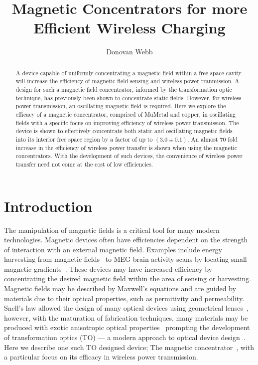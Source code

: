 \documentclass[11pt]{iopart}
\begin{document}
\title[]{Magnetic Concentrators for more Efficient Wireless Charging}

\author{Donovan Webb}

\address{Department of Physics,
University of Bath, Bath BA2 7AY, United Kingdom}

\begin{abstract}

A device capable of uniformly concentrating a magnetic field within a
free space cavity will increase the efficiency of magnetic field
sensing and wireless power tranmission.
A design for such a magnetic field concentrator, informed by the
transformation optic technique, has previously been shown to
concentrate static fields.
However, for wireless power transmission, an oscillating magnetic
field is required.
Here we explore the efficacy of a magnetic concentrator, comprised of
MuMetal and copper, in oscillating fields with a specific focus on
improving efficiency of wireless power transmission.
The device is shown to effectively concentrate both static and
oscillating magnetic fields into its interior free space region by a
factor of up to $(3.0\pm0.1)$. An almost $70$ fold increase in the
efficiency of wireless power transfer is shown when using the magnetic
concentrators.
With the development of such devices, the convenience of wireless
power transfer need not come at the cost of low efficiencies.


\end{abstract}
\section{Introduction}

The manipulation of magnetic fields is a critical tool for many modern
technologies. Magnetic devices often have efficiencies dependent on
the strength of interaction with an external magnetic field. Examples
include energy harvesting from magnetic fields~\cite{Hirai2000} to
MEG brain activity scans by locating small magnetic
gradients~\cite{Cohen1968}. These devices may have increased efficiency by
concentrating the desired magnetic field within the area of sensing or
harvesting. \\ Magnetic fields may be described by Maxwell's
equations and are guided by materials due to their
optical properties, such as permitivity and permeability. Snell's law
allowed the design of many optical devices
using geometrical lenses~\cite{Pendry2012}, however, with the maturation
of fabrication techniques, many materials may be produced with exotic
anisotropic optical properties~\cite{Smith2004} prompting the development
of transformation optics (TO) --- a modern approach to optical device
design~\cite{Pendry2006}.\\ Here we describe one such TO designed
device; The magnetic concentrator~\cite{Navau2012}, with a particular
focus on its efficacy in wireless power transmission. \\
\end{document}
